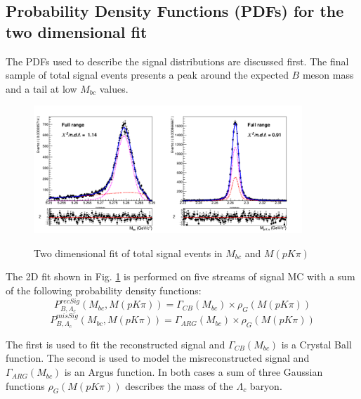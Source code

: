 \subsection{Probability Density Functions (PDFs) for the two dimensional fit}\label{sec:2DpdfChargedCorrBtoLambdaC}

The PDFs used to describe the signal distributions are discussed first. The final sample of total signal events presents a peak around the expected $B$ meson mass and a tail at low $M_{bc}$ values. 
\begin{figure}[H]
{\includegraphics[width=0.9\textwidth]{04-chargedCorrBtoLambda/figs/5streams_TotalSignal_charged_corrLambdaC_2Dfit.png}}
\caption{Two dimensional fit of total signal events in $M_{bc}$  and $M(p K \pi)$ }
\label{fig:5streams_TotalSignal_charged_corrLambdaC_2Dfit}
\end{figure}

The 2D fit shown in Fig. \ref{fig:5streams_TotalSignal_charged_corrLambdaC_2Dfit} is performed on five streams of signal MC with a sum of the following probability density functions:
\vspace{0.2 cm}
 \begin{equation}
        P^{recSig}_{B,\Lambda_c}(M_{bc}, M(p K \pi)) = \Gamma_{CB}(M_{bc}) \times \rho_G(M(p K \pi))
    \label{eq:RecSigEq}
\end{equation} 
\begin{equation}
        P^{misSig}_{B,\Lambda_c}(M_{bc}, M(p K \pi)) = \Gamma_{ARG}(M_{bc}) \times \rho_G(M(p K \pi))
    \end{equation}  \label{eq:MisSigEq}

The first is used to fit the reconstructed signal and $\Gamma_{CB}(M_{bc})$ is a Crystal Ball function. The second is used to model the misreconstructed signal and $\Gamma_{ARG}(M_{bc})$ is an Argus function. In both cases a sum of three Gaussian functions $\rho_G(M(p K \pi))$ describes the mass of the $\Lambda_c$ baryon.  


